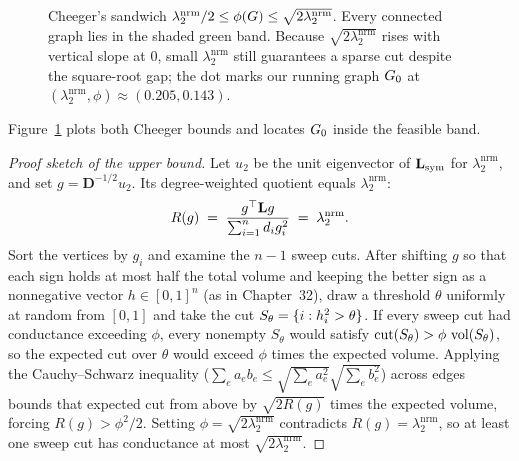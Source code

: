 \begin{figure}[htbp]
\caption{Cheeger's sandwich $\lambda_2^{\mathrm{nrm}}/2 \le \phi(G) \le \sqrt{2\lambda_2^{\mathrm{nrm}}}$. Every connected graph lies in the shaded green band. Because $\sqrt{2\lambda_2^{\mathrm{nrm}}}$ rises with vertical slope at $0$, small $\lambda_2^{\mathrm{nrm}}$ still guarantees a sparse cut despite the square-root gap; the dot marks our running graph $G_0$ at $(\lambda_2^{\mathrm{nrm}}, \phi) \approx (0.205, 0.143)$.}
\label{ch33:fig-cheeger-band}
\end{figure}

Figure~\ref{ch33:fig-cheeger-band} plots both Cheeger bounds and locates $G_0$ inside the feasible band.

\begin{proof}[Proof sketch of the upper bound]
Let $u_2$ be the unit eigenvector of $\mathbf{L}_{\mathrm{sym}}$ for $\lambda_2^{\mathrm{nrm}}$, and set $g=\mathbf{D}^{-1/2}u_2$. Its degree-weighted quotient equals $\lambda_2^{\mathrm{nrm}}$:
\[
  R(g) \;=\; \frac{g^\top\mathbf{L} g}{\sum_{i=1}^n d_i g_i^2} \;=\; \lambda_2^{\mathrm{nrm}}.
\]
Sort the vertices by $g_i$ and examine the $n-1$ sweep cuts. After shifting $g$ so that each sign holds at most half the total volume and keeping the better sign as a nonnegative vector $h \in [0,1]^n$ (as in Chapter~32), draw a threshold $\theta$ uniformly at random from $[0,1]$ and take the cut $S_\theta = \{i : h_i^2 > \theta\}$. If every sweep cut had conductance exceeding $\phi$, every nonempty $S_\theta$ would satisfy $\operatorname{cut}(S_\theta) > \phi\,\operatorname{vol}(S_\theta)$, so the expected cut over $\theta$ would exceed $\phi$ times the expected volume. Applying the Cauchy--Schwarz inequality ($\sum_e a_e b_e \le \sqrt{\sum_e a_e^2}\sqrt{\sum_e b_e^2}$) across edges bounds that expected cut from above by $\sqrt{2 R(g)}$ times the expected volume, forcing $R(g) > \phi^2/2$. Setting $\phi = \sqrt{2\lambda_2^{\mathrm{nrm}}}$ contradicts $R(g) = \lambda_2^{\mathrm{nrm}}$, so at least one sweep cut has conductance at most $\sqrt{2\lambda_2^{\mathrm{nrm}}}$.
\end{proof}

